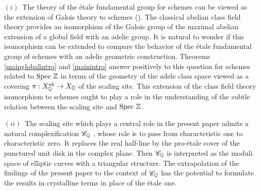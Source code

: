 \begin{rem}    
$(i)$~The theory of the \'etale fundamental group for schemes can be viewed as the extension of Galois theory to schemes (\cite{Lenstra}). The classical abelian class field theory provides an isomorphism of the Galois group of the maximal abelian extension of a global field with an adelic group. It is natural to wonder if this %
 isomorphism can be extended to compare the behavior of the \'etale fundamental group of schemes with an adelic geometric construction.
Theorems \ref{mainglobalintro} and \ref{mainintro} %
answer positively to this question for  schemes related to ${\rm Spec\,}\,\mathbb{Z}$ in terms of the geometry of the adele class space viewed as a covering $\pi:X_{\mathbb Q}^{ab}\to X_{\mathbb Q}$ of the scaling site. This extension of the class field theory isomorphism to schemes ought to play a role in the understanding of  the subtle relation between the scaling site and ${\rm Spec\,}\,\mathbb{Z}$.	\newline

$(ii)$~The scaling site which plays a central role in the present paper admits a natural complexification $\mathscr C_{\mathbb Q}$ \cite{CCsurvey}, whose role is to pass from characteristic one to characteristic zero. It replaces the real half-line by the pro-\'etale cover of the punctured unit disk in the complex plane. Then $\mathscr C_{\mathbb Q}$  is interpreted as the moduli space of elliptic curves with a triangular structure. The extrapolation of the findings of the present paper to the context of 
$\mathscr C_{\mathbb Q}$
  has the potential to formulate the results in   crystalline terms in place of the \'etale one. 
\end{rem}

